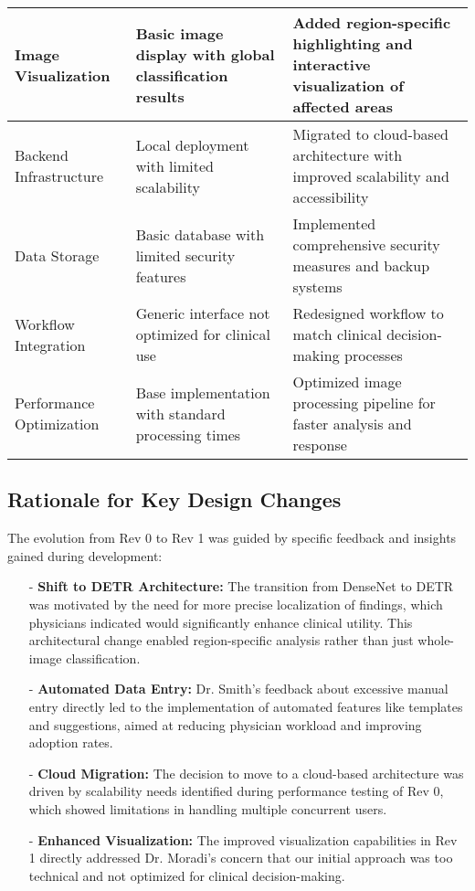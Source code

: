 \documentclass{article}
\begin{document}
\begin{longtable}{| p{} | p{} | p{} |}
    Image Visualization & Basic image display with global classification results & Added region-specific highlighting and interactive visualization of affected areas \\
    \hline
    
    Backend Infrastructure & Local deployment with limited scalability & Migrated to cloud-based architecture with improved scalability and accessibility \\
    \hline
    
    Data Storage & Basic database with limited security features & Implemented comprehensive security measures and backup systems \\
    \hline
    
    Workflow Integration & Generic interface not optimized for clinical use & Redesigned workflow to match clinical decision-making processes \\
    \hline
    
    Performance Optimization & Base implementation with standard processing times & Optimized image processing pipeline for faster analysis and response \\
    \hline
    
    
\end{longtable}

\subsection{Rationale for Key Design Changes}

The evolution from Rev 0 to Rev 1 was guided by specific feedback and insights gained during development:

\begin{itemize}
    \item[-] \textbf{Shift to DETR Architecture:} The transition from DenseNet to DETR was motivated by the need for more precise localization of findings, which physicians indicated would significantly enhance clinical utility. This architectural change enabled region-specific analysis rather than just whole-image classification.
    
    \item[-] \textbf{Automated Data Entry:} Dr. Smith's feedback about excessive manual entry directly led to the implementation of automated features like templates and suggestions, aimed at reducing physician workload and improving adoption rates.
    
    \item[-] \textbf{Cloud Migration:} The decision to move to a cloud-based architecture was driven by scalability needs identified during performance testing of Rev 0, which showed limitations in handling multiple concurrent users.
    
    \item[-] \textbf{Enhanced Visualization:} The improved visualization capabilities in Rev 1 directly addressed Dr. Moradi's concern that our initial approach was too technical and not optimized for clinical decision-making.
\end{itemize}
\end{document}
